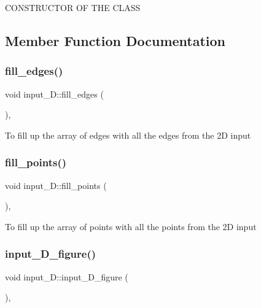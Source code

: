 C\+O\+N\+S\+T\+R\+U\+C\+T\+OR OF T\+HE C\+L\+A\+SS 

\subsection{Member Function Documentation}
\mbox{\label{classinput__2_d_ac9728c66a5a78d503d5d2d3bdcb18131}} 
\subsubsection{fill\+\_\+edges()}
{\footnotesize\ttfamily void input\+\_\+D\+::fill\+\_\+edges (\begin{DoxyParamCaption}{ }\end{DoxyParamCaption})\hspace{0.3cm}{\ttfamily [inline]}, {\ttfamily [private]}}

To fill up the array of edges with all the edges from the 2D input \mbox{\label{classinput__2_d_a9969399caf23cd0404b5bc0ebb4839b9}} 
\subsubsection{fill\+\_\+points()}
{\footnotesize\ttfamily void input\+\_\+D\+::fill\+\_\+points (\begin{DoxyParamCaption}{ }\end{DoxyParamCaption})\hspace{0.3cm}{\ttfamily [inline]}, {\ttfamily [private]}}

To fill up the array of points with all the points from the 2D input \mbox{\label{classinput__2_d_aa63a71dd4f8feb2264bf64da51854bc7}} 
\subsubsection{input\+\_\+D\+\_\+figure()}
{\footnotesize\ttfamily void input\+\_\+D\+::input\+\_\+D\+\_\+figure (\begin{DoxyParamCaption}{ }\end{DoxyParamCaption})\hspace{0.3cm}{\ttfamily [inline]}, {\ttfamily [private]}}


